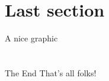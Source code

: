 \documentclass[aspectratio=169]{beamer}    %
\begin{document}
\section{Last section}
\begin{frame}{A nice graphic}
    \centering
    
\end{frame}

\section*{}
\begin{frame}{The End}
    \centering
    \LARGE That's all folks!
\end{frame}
\end{document}
